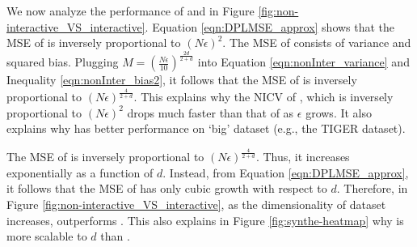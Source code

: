  We now analyze the performance of \dpl and \eugkm in Figure \ref{fig:non-interactive_VS_interactive}. Equation \ref{eqn:DPLMSE_approx} shows that the MSE of \dpl is inversely proportional to $(N\epsilon)^2$. The MSE of \eugkm consists of variance and squared bias. Plugging $M=\left(\frac{N\epsilon}{10}\right )^{\frac{2d}{2+d}}$ into Equation \ref{eqn:nonInter_variance} and Inequality \ref{eqn:nonInter_bias2},
it follows that the MSE of \eugkm is inversely proportional to $(N\epsilon)^{\frac{4}{2+d}}$. This explains why the NICV of \dpl, which is inversely proportional to $(N\epsilon)^2$ drops much faster than that of \eugkm as $\epsilon$ grows. It also explains why \dpl has better performance on `big' dataset (e.g., the TIGER dataset).


The MSE of \eugkm is inversely proportional to $(N\epsilon)^{\frac{4}{2+d}}$. Thus, it increases exponentially as a function of $d$. Instead, from Equation \ref{eqn:DPLMSE_approx}, it follows that the MSE of \dpl has only cubic growth with respect to $d$. Therefore, in Figure \ref{fig:non-interactive_VS_interactive}, as the dimensionality of dataset increases, \dpl outperforms \eugkm. This also explains in Figure \ref{fig:synthe-heatmap}  why \dpl is more scalable to $d$ than \eugkm.


